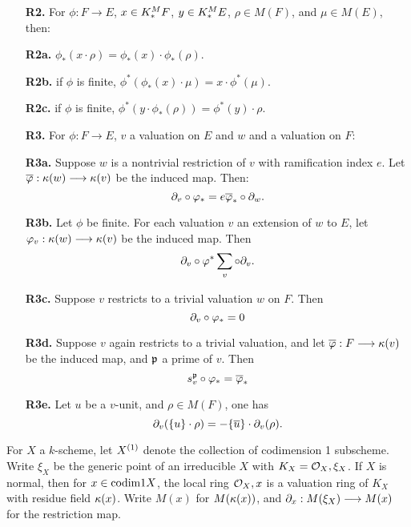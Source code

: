 \begin{defn}
\begin{enumerate}
\item[\textbf{R2.}] For $\phi: F \to E$, $x \in \milK_*F$, $y \in
\milK_*E$, $\rho \in M(F)$, and $\mu \in M(E)$, then:

\item[\textbf{R2a.}] $\phi_*(x \cdot \rho) = \phi_*(x) \cdot 
\phi_*(\rho)$.

\item[\textbf{R2b.}] if $\phi$ is finite, $\phi^*(\phi_*(x) \cdot 
\mu) = x \cdot \phi^*(\mu)$.

\item[\textbf{R2c.}] if $\phi$ is finite, $\phi^*(y \cdot 
\phi_*(\rho)) = \phi^*(y) \cdot \rho$.

\item[\textbf{R3.}] For $\phi: F \to E$, $v$ a valuation on $E$
and $w$ and a valuation on $F$:

\item[\textbf{R3a.}] Suppose $w$ is a nontrivial restriction of 
$v$ with ramification index $e$. Let $\phib: \resf{w} \to 
\resf{v}$ be the induced map. Then:
\[
\res{v} \comp \phi_* = e \phib_* \comp \res{w}.
\]

\item[\textbf{R3b.}] Let $\phi$ be finite. For each valuation $v$ 
an extension of $w$ to $E$, let $\phi_v: \resf{w} \to \resf{v}$
be the induced map. Then
\[
\res{v} \comp \phi^* \sum_{v} \comp \res{v}.
\]

\item[\textbf{R3c.}] Suppose $v$ restricts to a trivial valuation
$w$ on $F$. Then
\[
\res{v} \comp \phi_* = 0
\]

\item[\textbf{R3d.}] Suppose $v$ again restricts to a trivial 
valuation, and let $\phib: F \to \resf{v}$ be the induced map, and
$\ideal{p}$ a prime of $v$. Then
\[
\Special{v}{\ideal{p}} \comp \phi_* = \phib_*
\]

\item[\textbf{R3e.}] Let $u$ be a $v$-unit, and $\rho \in M(F)$,
one has
\[
\res{v}(\{u\} \cdot \rho) = -\{\overline{u}\} \cdot \res{v}(\rho).
\]
\end{enumerate}
\end{defn}

For $X$ a $k$-scheme, let $\subsch{1}{X}$ denote the collection of 
codimension 1 subscheme. Write $\xi_X$ be the generic point of an
irreducible $X$ with $K_X = \O_X,\xi_X$. If $X$ is normal, then 
for $x \in \codim{1}{X}$, the local ring $\O_X,x$ is a valuation 
ring of $K_X$ with residue field $\resf{x}$. Write $M(x)$ for 
$M(\resf{x})$, and $\res{x}: M(\xi_X) \to M(x)$ for the 
restriction map.

